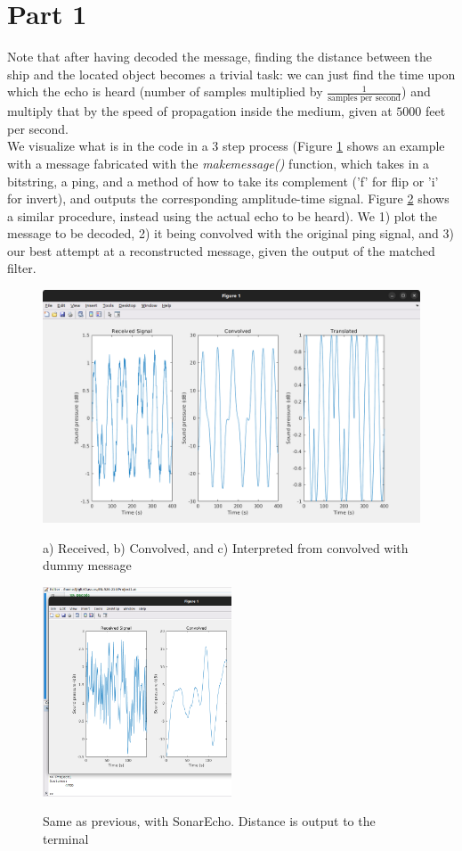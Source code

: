 \documentclass{article}
\begin{document}
\section{Part 1}
	Note that after having decoded the message, finding the distance between the ship and the located object becomes a trivial task: we can just find the time upon which the echo is heard (number of samples multiplied by $\frac{1}{\text{samples per second}}$) and multiply that by the speed of propagation inside the medium, given at $5000$ feet per second. \\
	We visualize what is in the code in a 3 step process (Figure \ref{3stepfakecode} shows an example with a message fabricated with the \emph{makemessage()} function, which takes in a bitstring, a ping, and a method of how to take its complement ('f' for flip or 'i' for invert), and outputs the corresponding amplitude-time signal. Figure \ref{3steprealcode} shows a similar procedure, instead using the actual echo to be heard).
	We 1) plot the message to be decoded, 2) it being convolved with the original ping signal, and 3) our best attempt at a reconstructed message, given the output of the matched filter.
\begin{figure}[h]
	\includegraphics[width =\textwidth]{3stepfakecode.png}
	\label{3stepfakecode}
	\caption{a) Received, b) Convolved, and c) Interpreted from convolved with dummy message}
\end{figure}
\begin{figure}[h]
	\includegraphics[width =0.5\textwidth]{3steprealcode.png}
	\label{3steprealcode}
	\caption{Same as previous, with SonarEcho. Distance is output to the terminal} 
\end{figure}
\end{document}

